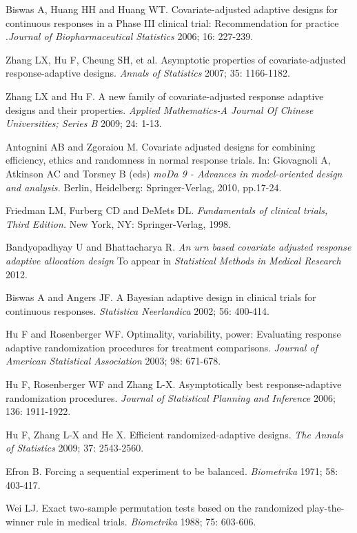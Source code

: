 \begin{thebibliography}
  Biswas A, Huang HH and Huang WT. Covariate-adjusted adaptive designs for continuous responses in a Phase III clinical trial:
Recommendation for practice .\textit{Journal of Biopharmaceutical
Statistics} 2006; 16: 227-239.

 Zhang LX, Hu F,  Cheung SH, et al. Asymptotic properties of covariate-adjusted response-adaptive designs.  \textit{Annals of Statistics} 2007; 35: 1166-1182.

 Zhang LX and Hu F.  A new family of covariate-adjusted response adaptive designs and their properties. \textit{Applied Mathematics-A Journal Of Chinese Universities; Series B} 2009; 24: 1-13.

 Antognini AB and Zgoraiou M. Covariate adjusted designs for  combining efficiency, ethics and randomness in normal response trials. In: Giovagnoli A,  Atkinson AC and Torsney B (eds) \textit{moDa 9 - Advances in model-oriented design and analysis.} Berlin, Heidelberg: Springer-Verlag, 2010, pp.17-24.

 Friedman LM, Furberg CD and DeMets DL. \textit{Fundamentals of clinical trials, Third Edition.} New York, NY: Springer-Verlag, 1998.

 Bandyopadhyay U and Bhattacharya R. \textit{An urn based  covariate adjusted response adaptive allocation design} To appear in \textit{Statistical Methods in Medical Research} 2012.

 Biswas A and Angers JF.  A Bayesian adaptive design in clinical trials for continuous responses. \textit{Statistica Neerlandica} 2002; 56: 400-414.

 Hu F and  Rosenberger WF. Optimality, variability, power: Evaluating response adaptive randomization procedures for treatment comparisons. \textit{Journal of American Statistical Association} 2003; 98: 671-678.

 Hu F, Rosenberger WF and Zhang L-X.  Asymptotically best response-adaptive randomization procedures. \textit{Journal of Statistical Planning and Inference} 2006; 136: 1911-1922.

 Hu F, Zhang L-X and He X. Efficient randomized-adaptive designs. \textit{The Annals of Statistics} 2009; 37: 2543-2560.

 Efron B. Forcing a sequential experiment to be balanced. \textit{Biometrika} 1971; 58: 403-417.

 Wei LJ. Exact two-sample permutation tests based on the randomized play-the-winner rule in medical trials. \textit{Biometrika} 1988; 75: 603-606.


\end{thebibliography}
